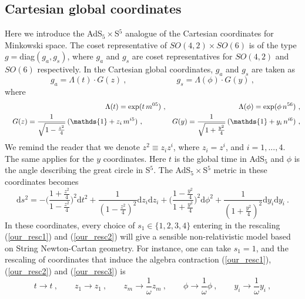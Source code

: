 \documentclass[12pt]{article}
\def\dd{\text{d}}
\numberwithin{equation}{section}
\begin{document}
\begin{appendices}
\subsection{Cartesian global coordinates}
Here we introduce the AdS$_5\times$S$^5$ analogue of the Cartesian coordinates for Minkowski space. 
The coset representative of $SO(4,2) \times SO(6)$ is of the type $g = $diag$(g_a, g_s)$, where $g_a$ and $g_s$ are coset representatives for $SO(4,2)$ and $SO(6)$ respectively. In the Cartesian global coordinates, $g_a$ and $g_s$ are taken as 
\begin{equation}
\label{cartesian_coset}
g_a = \Lambda(t) \cdot G(z) \ , \qquad\qquad\qquad
g_s = \Lambda(\phi) \cdot G(y) \ ,  
\end{equation}
where
\begin{eqnarray}
\notag
&&\hspace{1cm}\Lambda(t) = \exp ( t\, m^{05}) \ , \hspace{3.5cm}
\Lambda(\phi) = \exp ( \phi \, n^{56}) \ ,  \\
&&G(z) = \frac{1}{\sqrt{1- \frac{z^2}{4}}} \, ( \mathds{1} + z_i \,m^{i 5}) \ , \qquad\qquad
G(y) =  \frac{1}{\sqrt{1 + \frac{y^2}{4}}} \, ( \mathds{1} + y_i \, n^{i 6})\ ,
\end{eqnarray}
We remind the reader that we denote $z^2 \equiv z_i z^i$, where $z_i = z^i$, and $i = 1, ... , 4$. The same applies for the $y$ coordinates. Here $t$ is the global time in AdS$_5$ and $\phi$ is the angle describing the great circle in S$^5$.   
The AdS$_5\times$S$^5$ metric in these coordinates becomes
\begin{equation}
\dd s^2 = - \bigg(\frac{1+ \frac{z^2}{4}}{1-\frac{z^2}{4}}\bigg)^2 \dd t^2 + \frac{1}{(1-\frac{z^2}{4})^2} \dd z_i \dd z_i + \bigg(\frac{1 - \frac{y^2}{4}}{1 + \frac{y^2}{4}}\bigg)^2\dd \phi^2 + \frac{1}{(1+\frac{y^2}{4})^2} \dd y_i \dd y_i \ .
\end{equation}
In these coordinates, every choice of $s_1 \in \{1, 2, 3, 4\}$ entering in the rescaling (\ref{our_resc1}) and (\ref{our_resc2}) will give a sensible non-relativistic model based on String Newton-Cartan geometry.  For instance, one can take $s_1 = 1$, and the rescaling of coordinates that induce the algebra contraction (\ref{our_resc1}), (\ref{our_resc2}) and (\ref{our_resc3}) is 
\begin{equation}
t \rightarrow t \ ,  \qquad 
z_1 \rightarrow z_1 \ ,  \qquad
 z_m \rightarrow \frac{1}{\omega} z_m \ , \qquad
 \phi \rightarrow \frac{1}{\omega} \phi \ ,  \qquad
 y_i \rightarrow \frac{1}{\omega} y_i \ , 

\end{equation}
\end{appendices}
\end{document}
